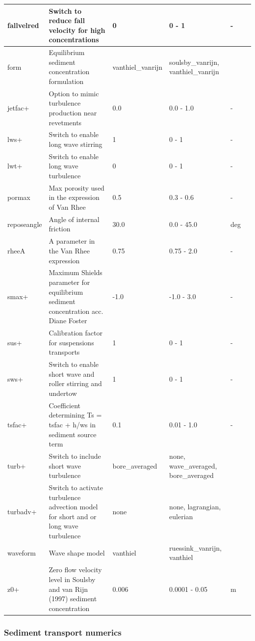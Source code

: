 \documentclass{article}
\begin{document}
\begin{tabular}{|p{0.7in}|p{0.8in}|p{0.8in}|p{0.9in}|p{0.5in}|p{0.5in}|}
fallvelred & Switch to reduce fall velocity for high concentrations & 0 & 0 - 1 & - &  \\ \hline 
form & Equilibrium sediment concentration formulation & vanthiel\_vanrijn & soulsby\_vanrijn, vanthiel\_vanrijn &  &  \\ \hline 
jetfac+ & Option to mimic turbulence production near revetments & 0.0 & 0.0 - 1.0 & - &  \\ \hline 
lws+ & Switch to enable long wave stirring & 1 & 0 - 1 & - &  \\ \hline 
lwt+ & Switch to enable long wave turbulence & 0 & 0 - 1 & - &  \\ \hline 
pormax & Max porosity used in the expression of Van Rhee & 0.5 & 0.3 - 0.6 & - &  \\ \hline 
reposeangle & Angle of internal friction & 30.0 & 0.0 - 45.0 & deg &  \\ \hline 
rheeA & A parameter in the Van Rhee expression  & 0.75 & 0.75 - 2.0 & - &  \\ \hline 
smax+ & Maximum Shields parameter for equilibrium sediment concentration acc. Diane Foster & -1.0 & -1.0 - 3.0 & - &  \\ \hline 
sus+ & Calibration factor for suspensions transports & 1 & 0 - 1 & - &  \\ \hline 
sws+ & Switch to enable short wave and roller stirring and undertow & 1 & 0 - 1 & - &  \\ \hline 
tsfac+ & Coefficient determining Ts = tsfac + h/ws in sediment source term & 0.1 & 0.01 - 1.0 & - &  \\ \hline 
turb+ & Switch to include short wave turbulence & bore\_averaged & none, wave\_averaged, bore\_averaged &  &  \\ \hline 
turbadv+ & Switch to activate turbulence advection model for short and or long wave turbulence & none & none, lagrangian, eulerian &  &  \\ \hline 
waveform & Wave shape model & vanthiel & ruessink\_vanrijn, vanthiel &  &  \\ \hline 
z0+ & Zero flow velocity level in Soulsby and van Rijn (1997) sediment concentration & 0.006 & 0.0001 - 0.05 & m &  \\ \hline 
\end{tabular}


\subsubsection{ Sediment transport numerics}
\end{document}
